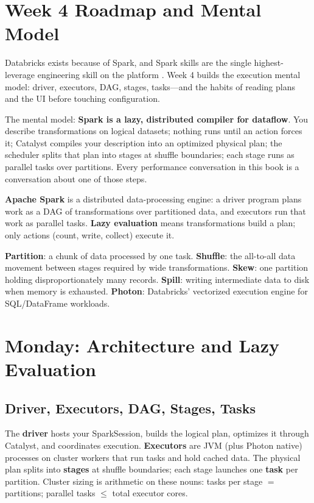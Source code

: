 \section{Week 4 Roadmap and Mental Model}
Databricks exists because of Spark, and Spark skills are the single highest-leverage engineering skill on the platform \cite{zaharia2012spark,chambersZaharia}. Week 4 builds the execution mental model: driver, executors, DAG, stages, tasks---and the habits of reading plans and the UI before touching configuration.

The mental model: \textbf{Spark is a lazy, distributed compiler for dataflow}. You describe transformations on logical datasets; nothing runs until an action forces it; Catalyst compiles your description into an optimized physical plan; the scheduler splits that plan into stages at shuffle boundaries; each stage runs as parallel tasks over partitions. Every performance conversation in this book is a conversation about one of those steps.

\begin{definitionbox}
\textbf{Apache Spark} is a distributed data-processing engine: a driver program plans work as a DAG of transformations over partitioned data, and executors run that work as parallel tasks. \textbf{Lazy evaluation} means transformations build a plan; only actions (count, write, collect) execute it.
\end{definitionbox}

\begin{keyterms}
\textbf{Partition}: a chunk of data processed by one task. \textbf{Shuffle}: the all-to-all data movement between stages required by wide transformations. \textbf{Skew}: one partition holding disproportionately many records. \textbf{Spill}: writing intermediate data to disk when memory is exhausted. \textbf{Photon}: Databricks' vectorized execution engine for SQL/DataFrame workloads.
\end{keyterms}

\section{Monday: Architecture and Lazy Evaluation}
\subsection{Driver, Executors, DAG, Stages, Tasks}
The \textbf{driver} hosts your SparkSession, builds the logical plan, optimizes it through Catalyst, and coordinates execution. \textbf{Executors} are JVM (plus Photon native) processes on cluster workers that run tasks and hold cached data. The physical plan splits into \textbf{stages} at shuffle boundaries; each stage launches one \textbf{task} per partition. Cluster sizing is arithmetic on these nouns: tasks per stage $=$ partitions; parallel tasks $\le$ total executor cores.

